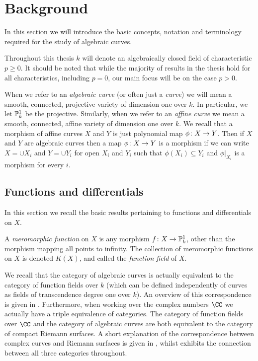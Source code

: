 \chapter{Background}\label{chapterbackground}


In this section we will introduce the basic concepts, notation and terminology required for the study of algebraic curves.

Throughout this thesis $k$ will denote an algebraically closed field of characteristic $p \geq 0$.
It should be noted that while the majority of results in the thesis hold for all characteristics, including $p=0$, our main focus will be on the case $p > 0$.

When we refer to an \emph{algebraic curve} (or often just a \emph{curve}) we will mean a smooth, connected, projective variety of dimension one over $k$.
In particular, we let ${\mathbb P}_k^1$ be the projective.
Similarly, when we refer to an \emph{affine curve} we mean a smooth, connected, affine variety of dimension one over $k$. %
We recall that a morphism of affine curves $X$ and $Y$ is just polynomial map $\phi \colon X \rightarrow Y$.
Then if $X$ and $Y$ are algebraic curves then a map $\phi \colon X \rightarrow Y$ is a morphism if we can write $X = \cup X_i$ and $Y = \cup Y_i$ for open $X_i$ and $Y_i$ such that $\phi(X_i) \subseteq Y_i$ and $\phi|_{X_i}$ is a morphism for every $i$.



\section{Functions and differentials}

In this section we recall the basic results pertaining to functions and differentials on $X$.

A \emph{meromorphic function} on $X$ is any morphism $f \colon X \rightarrow {\mathbb P}_k^1$, other than the morphism mapping all points to infinity.
The collection of meromorphic functions on $X$ is denoted $K(X)$, and called the \emph{function field} of $X$.

We recall that the category of algebraic curves is actually equivalent to the category of function fields over $k$ (which can be defined independently of curves as fields of transcendence degree one over $k$).
An overview of this correspondence is given in \cite[Appendix B]{stichtenoth}.
Furthermore, when working over the complex numbers $\CC$ we actually have a triple equivalence of categories.
The category of function fields over $\CC$ and the category of algebraic curves are both equivalent to the category of compact Riemann surfaces. 
A short explanation of the correspondence between complex curves and Riemann surfaces is given in \cite[Chap.\ 1, \S 2]{griffiths}, whilst \cite{miranda} exhibits the connection between all three categories throughout.


